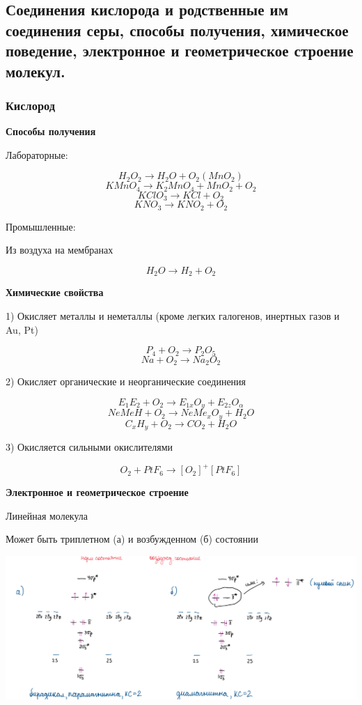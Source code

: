 \subsection{Соединения кислорода и родственные им соединения серы, способы получения, химическое поведение, электронное и геометрическое строение молекул.}

\subsubsection*{Кислород}

\textbf{Способы получения}
 
 Лабораторные:
 
$$H_2O_2 \rightarrow H_2O + O_2 (MnO_2)$$
$$KMnO_4 \rightarrow K_2MnO_4 + MnO_2 + O_2$$
$$KClO_3 \rightarrow KCl + O_2$$
$$KNO_3 \rightarrow KNO_2 + O_2$$

Промышленные:

Из воздуха на мембранах

$$H_2O \rightarrow H_2 + O_2$$

\textbf{Химические свойства}

1) Окисляет металлы и неметаллы (кроме легких галогенов, инертных газов и Au, Pt)

$$P_4 + O_2 \rightarrow P_2O_5$$
$$Na + O_2 \rightarrow Na_2O_2$$

2) Окисляет органические и неорганические соединения

$$E_1E_2 + O_2 \rightarrow E_{1x}O_y + E_{2z}O_{\alpha}$$
$$NeMeH + O_2 \rightarrow NeMe_xO_y + H_2O$$
$$C_xH_y + O_2 \rightarrow CO_2 + H_2O$$

3) Окисляется сильными окислителями

$$O_2 + PtF_6 \rightarrow [O_2]^+[PtF_6]$$

\textbf{Электронное и геометрическое строение}

Линейная молекула

Может быть триплетном (а) и возбужденном (б) состоянии

\includegraphics[scale=0.65]{images/6v1.png}


